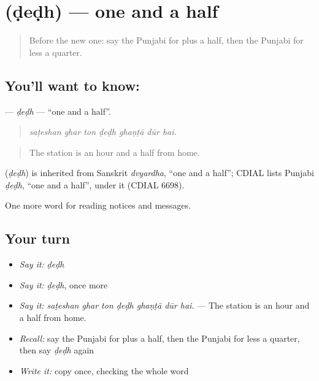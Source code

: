\section[\texorpdfstring{\pa{ਡੇਢ} (ḍeḍh)}{ਡੇਢ (ḍeḍh)}]{ (ḍeḍh) — one and a half}

\label{lesson:PA-C260-dedh}



\begin{quote}
Before the new one: say the Punjabi for plus a half, then the Punjabi for less a quarter.
\end{quote}

\subsection*{You'll want to know: }
\textbf{} — \emph{ḍeḍh} — \textquotedblleft{}one and a half\textquotedblright{}.

\begin{quote}
      
\end{quote}

\begin{quote}
\emph{saṭeshan ghar ton ḍeḍh ghaṇṭā dūr hai.}
\end{quote}

\begin{quote}
The station is an hour and a half from home.
\end{quote}

\begin{cousinweb}
\textbf{} (\emph{ḍeḍh}) is inherited from Sanskrit \emph{dvyardha}, \textquotedblleft{}one and a half\textquotedblright{}; CDIAL lists Punjabi \emph{ḍeḍh}, \textquotedblleft{}one and a half\textquotedblright{}, under it (CDIAL 6698).
\end{cousinweb}

\begin{grammarlens}[title={What you've built}]
One more word for reading notices and messages.
\end{grammarlens}

\subsection*{Your turn}
\begin{itemize}
\raggedright
  \item \emph{Say it:} \emph{ḍeḍh}
  \item \emph{Say it:} \emph{ḍeḍh}, once more
  \item \emph{Say it:} \emph{saṭeshan ghar ton ḍeḍh ghaṇṭā dūr hai.} — The station is an hour and a half from home.
  \item \emph{Recall:} say the Punjabi for plus a half, then the Punjabi for less a quarter, then say \emph{ḍeḍh} again
  \item \emph{Write it:} copy \textbf{} once, checking the whole word
\end{itemize}

